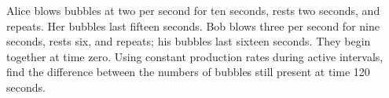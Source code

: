 Alice blows bubbles at two per second for ten seconds, rests two seconds, and repeats. Her bubbles last fifteen seconds. Bob blows three per second for nine seconds, rests six, and repeats; his bubbles last sixteen seconds. They begin together at time zero. Using constant production rates during active intervals, find the difference between the numbers of bubbles still present at time 120 seconds.
